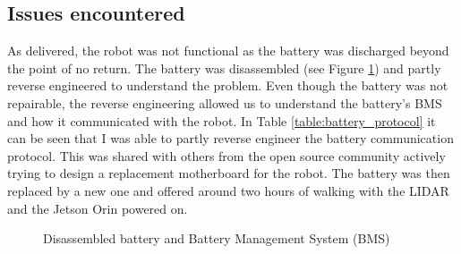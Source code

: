 \documentclass[12pt]{article}
\begin{document}
    \subsection{Issues encountered}
        \label{section:go2_battery}
        As delivered, the robot was not functional as the battery was discharged beyond the point of no return. The battery was disassembled (see Figure \ref{fig:disassembled_battery}) and partly reverse engineered to understand the problem. Even though the battery was not repairable, the reverse engineering allowed us to understand the battery's BMS and how it communicated with the robot. In Table \ref{table:battery_protocol} it can be seen that I was able to partly reverse engineer the battery communication protocol. This was shared with others from the open source community actively trying to design a replacement motherboard for the robot. The battery was then replaced by a new one and offered around two hours of walking with the LIDAR and the Jetson Orin powered on.

        \begin{figure}[h]
            \centering
            \caption{Disassembled battery and Battery Management System (BMS)}
            \label{fig:disassembled_battery}
        \end{figure}
\end{document}
